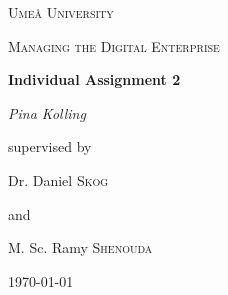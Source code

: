\documentclass[a4]{scrartcl}
\begin{document}
	
	\begin{titlepage}
		\centering
		{\scshape\LARGE Umeå University \par}
		\vspace{1cm}
		{\scshape\Large Managing the Digital Enterprise \par }
		\vspace{1.5cm}
		{\huge\bfseries  Individual Assignment 2 \par}
		\vspace{2cm}
		{\Large\itshape Pina Kolling\par}
		\vfill
		supervised by \par 
		\vspace{1cm}
		Dr. Daniel \textsc{Skog} \par 
		and \par 
		M. Sc. Ramy \textsc{Shenouda} 
		
		\vfill
		
		{\large \today\par}
	\end{titlepage}
	
	\setcounter{page}{1}
	
	\begin{doublespace}
		\tableofcontents
	\end{doublespace}

	
	\newpage



\end{document}
